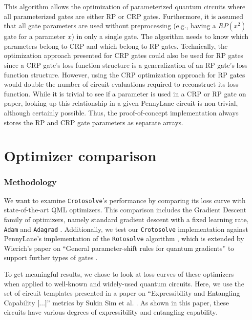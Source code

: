This algorithm allows the optimization of parameterized quantum circuits where
all parameterized gates are either RP or CRP gates.
Furthermore, it is assumed that all gate parameters are used without
preprocessing (e.g., having a $RP(x^2)$ gate for a parameter $x$) in only a
single gate.
The algorithm needs to know which parameters belong to CRP and which belong to
RP gates.
Technically, the optimization approach presented for CRP gates could also be
used for RP gates since a CRP gate's loss function structure is a generalization
of an RP gate's loss function structure.
However, using the CRP optimization approach for RP gates would double the
number of circuit evaluations required to reconstruct its loss function.
While it is trivial to see if a parameter is used in a CRP or RP gate on paper,
looking up this relationship in a given PennyLane circuit is non-trivial,
although certainly possible.
Thus, the proof-of-concept implementation always stores the RP and CRP gate
parameters as separate arrays.

\section{Optimizer comparison}
\label{sec:optimizer-comparison}
\subsubsection*{Methodology}

We want to examine \texttt{Crotosolve}'s performance by comparing its loss curve
with state-of-the-art QML optimizers.
This comparison includes the Gradient Descent family of optimizers, namely
standard gradient descent with a fixed learning rate, %
\texttt{Adam} \cite{kingma_adam_2017} and
\texttt{Adagrad} \cite{duchi_adaptive_2011}.
Additionally, we test our \texttt{Crotosolve} implementation against PennyLane's
implementation of the \texttt{Rotosolve} algorithm
\cite{ostaszewski_structure_2021,bergholm_pennylane_2022}, which is extended by
Wierich's paper on ``General parameter-shift rules for quantum gradients'' to
support further types of gates \cite{wierichs_general_2022}.

To get meaningful results, we chose to look at loss curves of these optimizers
when applied to well-known and widely-used quantum circuits.
Here, we use the set of circuit templates presented in a paper on
``Expressibility and Entangling Capability [...]'' metrics by Sukin Sim et al.
\cite{sim_expressibility_2019}.
As shown in this paper, these circuits have various degrees of expressibility
and entangling capability. %

